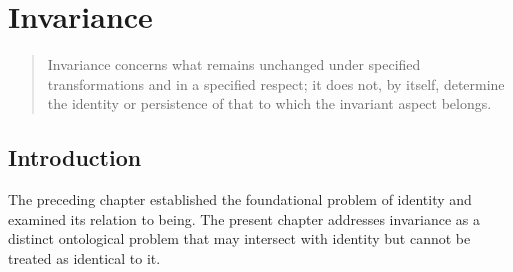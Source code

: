 %
%
%
%
%

\chapter{Invariance}
\label{ch:invariance}


\newcommand{\ChapterTwoTitle}{Invariance}
\newcommand{\ChapterTwoID}{VS.B01.P01.C02}


\begin{quote}
Invariance concerns what remains unchanged under specified
transformations and in a specified respect; it does not, by
itself, determine the identity or persistence of that to
which the invariant aspect belongs.
\end{quote}


\section*{Introduction}

The preceding chapter established the foundational problem
of identity and examined its relation to being. The present
chapter addresses invariance as a distinct ontological problem
that may intersect with identity but cannot be treated as
identical to it.

